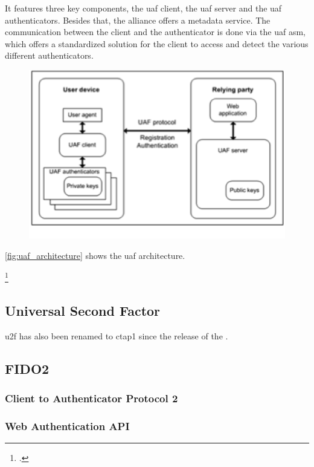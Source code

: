 It features three key components, the \gls{uaf} client, the \gls{uaf} server and the \gls{uaf} authenticators. Besides that, the alliance offers a metadata service. The communication between the client and the authenticator is done via the \gls{uaf} \gls{asm}, which offers a standardized solution for the client to access and detect the various different authenticators.

\begin{figure}[hbt]
	\centering
	\includegraphics[width=\textwidth]{pics/Picture1}
	\label{fig:uaf_architecture}
\end{figure}

\autoref{fig:uaf_architecture} shows the \gls{uaf} architecture.

\footcites[See][191]{7897543}[See][131]{10.1007/978-3-319-67639-5_11}[See][]{uaf-asm}

\subsection{Universal Second Factor}

\Gls{u2f} has also been renamed to \gls{ctap}1 since the release of the \wa{}.

\subsection{FIDO2}

\subsubsection{Client to Authenticator Protocol 2}

\subsubsection{Web Authentication API}
